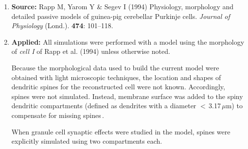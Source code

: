 \documentclass[12pt]{article}
\begin{document}
\begin{enumerate}

   \item {\bf Source:} Rapp M, Yarom Y \& Segev I (1994) Physiology, morphology and detailed passive models of guinea-pig cerebellar Purkinje cells. {\it Journal of Physiology} (Lond.). {\bf 474}: 101--118.

   \item {\bf Applied:} All simulations were performed with a model using the morphology of {\it cell I} of Rapp et
al. (1994) unless otherwise noted.

Because the morphological
data used to build the current model were obtained with light
microscopic techniques, the location and shapes of dendritic
spines for the reconstructed cell were not known. Accordingly,
spines were not simulated. Instead, membrane surface was added
to the spiny dendritic compartments (defined as dendrites with a
diameter $<$\,3.17\,$\mu$m) to compensate for missing spines\,\cite{R:1989cr, Rapp-M:1992kx}.

When granule cell synaptic effects were studied in the model, spines were
explicitly simulated using two compartments each.

\end{enumerate}



\end{document}
